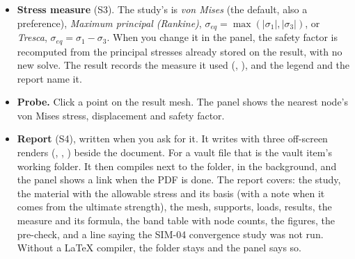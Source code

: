 \begin{itemize}[nosep]
        or remove a band, so there can be any number. \emph{Apply} sets the bands on the study (properties
         and ); the mesh and the legend follow at once. \emph{Save as default}
        writes them to the preference  ( ,
         ), and new studies start from it. Thresholds that
        do not rise from band to band are refused, and the panel says why.
  \item \textbf{Stress measure} (S3). The study's  is \emph{von Mises} (the default, also
        a preference), \emph{Maximum principal (Rankine)}, $\sigma_{eq}=\max(|\sigma_1|,|\sigma_3|)$, or
        \emph{Tresca}, $\sigma_{eq}=\sigma_1-\sigma_3$. When you change it in the panel, the safety factor is
        recomputed from the principal stresses already stored on the result, with no new solve. The result
        records the measure it used (, ), and the legend and the
        report name it.
  \item \textbf{Probe.} Click a point on the result mesh. The panel shows the nearest node's von Mises stress,
        displacement and safety factor.
  \item \textbf{Report} (S4), written when you ask for it. It writes
         with three off-screen renders (,
        , ) beside the document. For a vault file that is the vault
        item's working folder. It then compiles  next to the folder, in
        the background, and the panel shows a link when the PDF is done. The report covers: the study, the
        material with the allowable stress and its basis (with a note when it comes from the ultimate
        strength), the mesh, supports, loads, results, the measure and its formula, the band table with node
        counts, the figures, the pre-check, and a line saying the SIM-04 convergence study was not run.
        Without a LaTeX compiler, the  folder stays and the panel says so.
\end{itemize}

